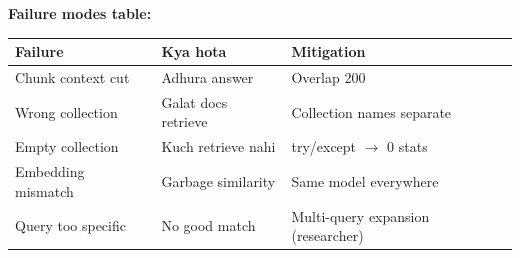 \begin{memorybox}
\textbf{Failure modes table:}

\begin{longtable}{p{4cm} p{5cm} p{4.5cm}}
\toprule
\textbf{Failure} & \textbf{Kya hota} & \textbf{Mitigation} \\
\midrule
Chunk context cut & Adhura answer & Overlap 200 \\
Wrong collection & Galat docs retrieve & Collection names separate \\
Empty collection & Kuch retrieve nahi & try/except $\rightarrow$ 0 stats \\
Embedding mismatch & Garbage similarity & Same model everywhere \\
Query too specific & No good match & Multi-query expansion (researcher) \\
\bottomrule
\end{longtable}
\end{memorybox}
